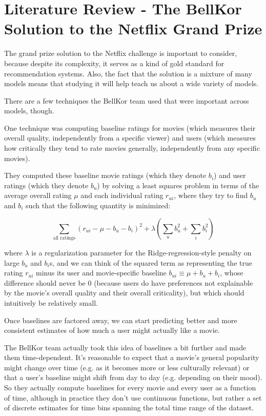 \documentclass[11pt]{article}
\begin{document}
\section*{Literature Review - The BellKor Solution to the Netflix Grand Prize}

The grand prize solution to the Netflix challenge is important to consider, because despite its complexity, it serves as a kind of gold standard for recommendation systems. Also, the fact that the solution is a mixture of many models means that studying it will help teach us about a wide variety of models.

There are a few techniques the BellKor team used that were important across models, though.

One technique was computing baseline ratings for movies (which measures their overall quality, independently from a specific viewer) and users (which measures how critically they tend to rate movies generally, independently from any specific movies).

They computed these baseline movie ratings (which they denote $b_i$) and user ratings (which they denote $b_u$) by solving a least squares problem in terms of the average overall rating $\mu$ and each individual rating $r_{ui}$, where they try to find $b_u$ and $b_i$ such that the following quantity is minimized:

$$
\sum_{\text{all ratings}} (r_{ui} - \mu - b_u - b_i)^2 + \lambda\left(\sum_u b_u^2 + \sum_i b_i^2\right)
$$

where $\lambda$ is a regularization parameter for the Ridge-regression-style penalty on large $b_u$ and $b_i$s, and we can think of the squared term as representing the true rating $r_{ui}$ minus its user and movie-specific baseline $b_{ui} \equiv \mu + b_u + b_i$, whose difference should never be 0 (because users do have preferences not explainable by the movie's overall quality and their overall criticality), but which should intuitively be relatively small.

Once baselines are factored away, we can start predicting better and more consistent estimates of how much a user might actually like a movie.

The BellKor team actually took this idea of baselines a bit further and made them time-dependent. It's reasonable to expect that a movie's general popularity might change over time (e.g. as it becomes more or less culturally relevant) or that a user's baseline might shift from day to day (e.g. depending on their mood). So they actually compute baselines for every movie and every user as a function of time, although in practice they don't use continuous functions, but rather a set of discrete estimates for time bins spanning the total time range of the dataset.
\end{document}
